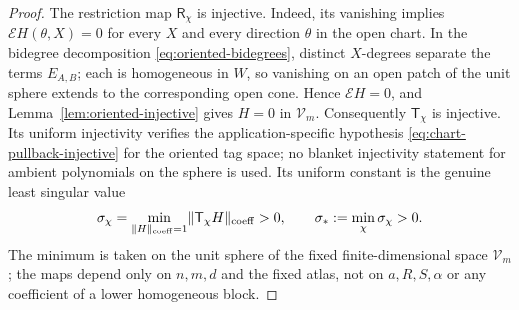 \documentclass[11pt]{article}
\numberwithin{equation}{section}
\theoremstyle{remark}
\theoremstyle{definition}
\newcommand{\norm}[1]{\lVert #1\rVert}
\begin{document}
\begin{proof}
The restriction map $\mathsf R_\chi$ is injective.  Indeed, its vanishing
implies $\mathcal EH(\theta,X)=0$ for every $X$ and every direction
$\theta$ in the open chart.  In the bidegree decomposition
\eqref{eq:oriented-bidegrees}, distinct $X$-degrees separate the terms
$E_{A,B}$; each is homogeneous in $W$, so vanishing on an open patch of
the unit sphere extends to the corresponding open cone.  Hence
$\mathcal EH=0$, and Lemma~\ref{lem:oriented-injective} gives $H=0$ in
$\mathcal V_m$.  Consequently $\mathsf T_\chi$ is injective.  Its uniform
injectivity verifies the application-specific hypothesis
\eqref{eq:chart-pullback-injective} for the oriented tag space; no blanket
injectivity statement for ambient polynomials on the sphere is used.  Its
uniform constant is the genuine least singular value
\begin{equation}\label{eq:detecting-tag-singular-value}
 \sigma_\chi
 =\min_{\norm H_{\rm coeff}=1}
   \norm{\mathsf T_\chi H}_{\rm coeff}>0,
 \qquad
 \sigma_*:=\min_\chi\sigma_\chi>0.
\end{equation}
The minimum is taken on the unit sphere of the fixed finite-dimensional
space $\mathcal V_m$; the maps depend only on $n,m,d$ and the fixed atlas,
not on $a,R,S,\alpha$ or any coefficient of a lower homogeneous block.


\end{proof}
\end{document}
